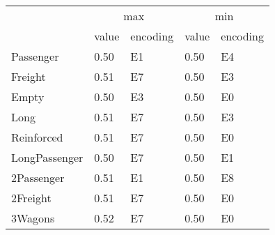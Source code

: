 \begin{tabular}{lllll}
\toprule
 & \multicolumn{2}{c}{max} & \multicolumn{2}{c}{min} \\
 & value & encoding & value & encoding \\
\midrule
Passenger & 0.50 & E1 & 0.50 & E4 \\
Freight & 0.51 & E7 & 0.50 & E3 \\
Empty & 0.50 & E3 & 0.50 & E0 \\
Long & 0.51 & E7 & 0.50 & E3 \\
Reinforced & 0.51 & E7 & 0.50 & E0 \\
LongPassenger & 0.50 & E7 & 0.50 & E1 \\
2Passenger & 0.51 & E1 & 0.50 & E8 \\
2Freight & 0.51 & E7 & 0.50 & E0 \\
3Wagons & 0.52 & E7 & 0.50 & E0 \\
\bottomrule
\end{tabular}
